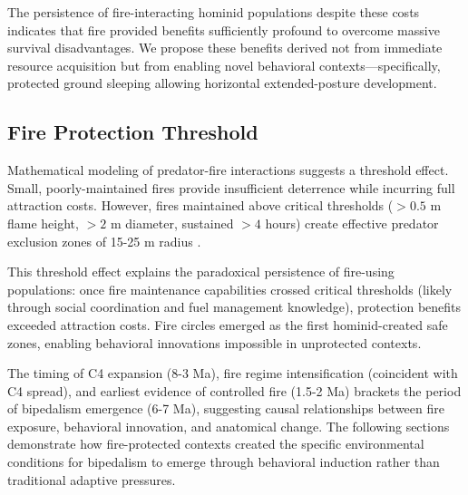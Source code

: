 The persistence of fire-interacting hominid populations despite these costs indicates that fire provided benefits sufficiently profound to overcome massive survival disadvantages. We propose these benefits derived not from immediate resource acquisition but from enabling novel behavioral contexts—specifically, protected ground sleeping allowing horizontal extended-posture development.

\subsection{Fire Protection Threshold}

Mathematical modeling of predator-fire interactions suggests a threshold effect. Small, poorly-maintained fires provide insufficient deterrence while incurring full attraction costs. However, fires maintained above critical thresholds ($>0.5$ m flame height, $>2$ m diameter, sustained $>4$ hours) create effective predator exclusion zones of 15-25 m radius \citep{gowlett2016earliest}.

This threshold effect explains the paradoxical persistence of fire-using populations: once fire maintenance capabilities crossed critical thresholds (likely through social coordination and fuel management knowledge), protection benefits exceeded attraction costs. Fire circles emerged as the first hominid-created safe zones, enabling behavioral innovations impossible in unprotected contexts.

The timing of C4 expansion (8-3 Ma), fire regime intensification (coincident with C4 spread), and earliest evidence of controlled fire (1.5-2 Ma) brackets the period of bipedalism emergence (6-7 Ma), suggesting causal relationships between fire exposure, behavioral innovation, and anatomical change. The following sections demonstrate how fire-protected contexts created the specific environmental conditions for bipedalism to emerge through behavioral induction rather than traditional adaptive pressures.
